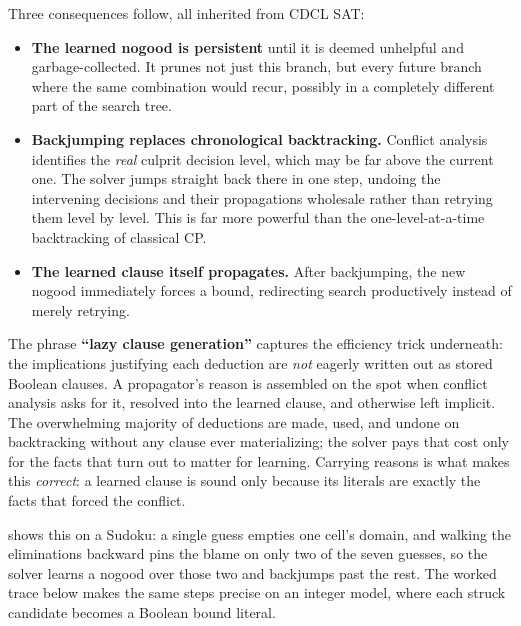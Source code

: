 Three consequences follow, all inherited from CDCL SAT:

\begin{itemize}
  \item \textbf{The learned nogood is persistent} until it is deemed unhelpful
  and garbage-collected. It prunes not just this branch, but every future branch
  where the same combination would recur, possibly in a completely different
  part of the search tree.
  \item \textbf{Backjumping replaces chronological backtracking.} Conflict
  analysis identifies the \emph{real} culprit decision level, which may be far
  above the current one. The solver jumps straight back there in one step,
  undoing the intervening decisions and their propagations wholesale rather than
  retrying them level by level. This is far more powerful than the
  one-level-at-a-time backtracking of classical CP.
  \item \textbf{The learned clause itself propagates.} After backjumping, the
  new nogood immediately forces a bound, redirecting search productively instead
  of merely retrying.
\end{itemize}

The phrase \textbf{``lazy clause generation''} captures the efficiency trick
underneath: the implications justifying each deduction are \emph{not} eagerly
written out as stored Boolean clauses. A propagator's reason is assembled on the
spot when conflict analysis asks for it, resolved into the learned clause, and
otherwise left implicit. The overwhelming majority of deductions are made, used,
and undone on backtracking without any clause ever materializing; the solver pays
that cost only for the facts that turn out to matter for learning. Carrying
reasons is what makes this \emph{correct}: a learned clause is sound only because
its literals are exactly the facts that forced the conflict.

 shows this on a Sudoku: a single guess empties one
cell's domain, and walking the eliminations backward pins the blame on only two of
the seven guesses, so the solver learns a nogood over those two and backjumps past
the rest. The worked trace below makes the same steps precise on an integer model,
where each struck candidate becomes a Boolean bound literal.


